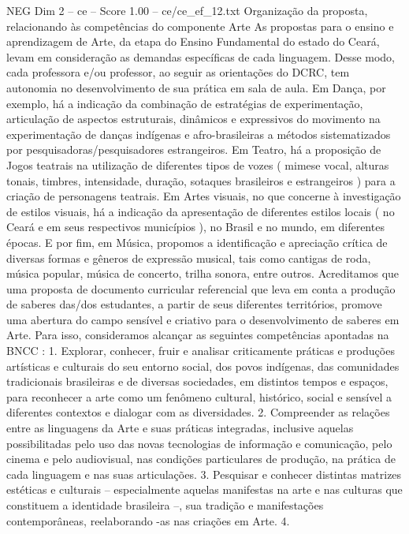 \begin{textsample}{NEG Dim 2 – ce – Score 1.00 – ce/ce\_ef\_12.txt}  \label{ex:f2_neg_204}
Organização da proposta, relacionando às competências do componente Arte As propostas para o ensino e aprendizagem de Arte, da etapa do Ensino Fundamental do estado do Ceará, levam em consideração as demandas específicas de cada linguagem.
Desse modo, cada professora e/ou professor, ao seguir as orientações do DCRC, tem autonomia no desenvolvimento de sua prática em sala de aula.
Em Dança, por exemplo, há a indicação da combinação de estratégias de experimentação, articulação de aspectos estruturais, dinâmicos e expressivos do movimento na experimentação de danças indígenas e afro-brasileiras a métodos sistematizados por pesquisadoras/pesquisadores estrangeiros.
Em Teatro, há a proposição de Jogos teatrais na utilização de diferentes tipos de vozes ( mimese vocal, alturas tonais, timbres, intensidade, duração, sotaques brasileiros e estrangeiros ) para a criação de personagens teatrais.
Em Artes visuais, no que concerne à investigação de estilos visuais, há a indicação da apresentação de diferentes estilos locais ( no Ceará e em seus respectivos municípios ), no Brasil e no mundo, em diferentes épocas.
E por fim, em Música, propomos a identificação e apreciação crítica de diversas formas e gêneros de expressão musical, tais como cantigas de roda, música popular, música de concerto, trilha sonora, entre outros.
Acreditamos que uma proposta de documento curricular referencial que leva em conta a produção de saberes das/dos estudantes, a partir de seus diferentes territórios, promove uma abertura do campo sensível e criativo para o desenvolvimento de saberes em Arte.
Para isso, consideramos alcançar as seguintes competências apontadas na BNCC : 1.
Explorar, conhecer, fruir e analisar criticamente práticas e produções artísticas e culturais do seu entorno social, dos povos indígenas, das comunidades tradicionais brasileiras e de diversas sociedades, em distintos tempos e espaços, para reconhecer a arte como um fenômeno cultural, histórico, social e sensível a diferentes contextos e dialogar com as diversidades. 2.
Compreender as relações entre as linguagens da Arte e suas práticas integradas, inclusive aquelas possibilitadas pelo uso das novas tecnologias de informação e comunicação, pelo cinema e pelo audiovisual, nas condições particulares de produção, na prática de cada linguagem e nas suas articulações. 3.
Pesquisar e conhecer distintas matrizes estéticas e culturais – especialmente aquelas manifestas na arte e nas culturas que constituem a identidade brasileira –, sua tradição e manifestações contemporâneas, reelaborando -as nas criações em Arte. 4.

\end{textsample}

